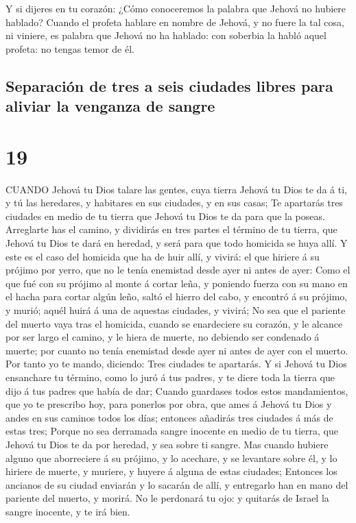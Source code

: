  Y si dijeres en tu corazón: ¿Cómo conoceremos la palabra
que Jehová no hubiere hablado?  Cuando el profeta hablare
en nombre de Jehová, y no fuere la tal cosa, ni viniere, es palabra que
Jehová no ha hablado: con soberbia la habló aquel profeta: no tengas
temor de él.

\hypertarget{separaciuxf3n-de-tres-a-seis-ciudades-libres-para-aliviar-la-venganza-de-sangre}{%
\subsection{Separación de tres a seis ciudades libres para aliviar la
venganza de
sangre}\label{separaciuxf3n-de-tres-a-seis-ciudades-libres-para-aliviar-la-venganza-de-sangre}}

\hypertarget{section-18}{%
\section{19}\label{section-18}}

 CUANDO Jehová tu Dios talare las gentes, cuya tierra Jehová
tu Dios te da á ti, y tú las heredares, y habitares en sus ciudades, y
en sus casas;  Te apartarás tres ciudades en medio de tu
tierra que Jehová tu Dios te da para que la poseas. 
Arreglarte has el camino, y dividirás en tres partes el término de tu
tierra, que Jehová tu Dios te dará en heredad, y será para que todo
homicida se huya allí.  Y este es el caso del homicida que
ha de huir allí, y vivirá: el que hiriere á su prójimo por yerro, que no
le tenía enemistad desde ayer ni antes de ayer:  Como el que
fué con su prójimo al monte á cortar leña, y poniendo fuerza con su mano
en el hacha para cortar algún leño, saltó el hierro del cabo, y encontró
á su prójimo, y murió; aquél huirá á una de aquestas ciudades, y vivirá;
 No sea que el pariente del muerto vaya tras el homicida,
cuando se enardeciere su corazón, y le alcance por ser largo el camino,
y le hiera de muerte, no debiendo ser condenado á muerte; por cuanto no
tenía enemistad desde ayer ni antes de ayer con el muerto. 
Por tanto yo te mando, diciendo: Tres ciudades te apartarás.
 Y si Jehová tu Dios ensanchare tu término, como lo juró á
tus padres, y te diere toda la tierra que dijo á tus padres que había de
dar;  Cuando guardases todos estos mandamientos, que yo te
prescribo hoy, para ponerlos por obra, que ames á Jehová tu Dios y andes
en sus caminos todos los días; entonces añadirás tres ciudades á más de
estas tres;  Porque no sea derramada sangre inocente en
medio de tu tierra, que Jehová tu Dios te da por heredad, y sea sobre ti
sangre.  Mas cuando hubiere alguno que aborreciere á su
prójimo, y lo acechare, y se levantare sobre él, y lo hiriere de muerte,
y muriere, y huyere á alguna de estas ciudades;  Entonces
los ancianos de su ciudad enviarán y lo sacarán de allí, y entregarlo
han en mano del pariente del muerto, y morirá.  No le
perdonará tu ojo: y quitarás de Israel la sangre inocente, y te irá
bien.


